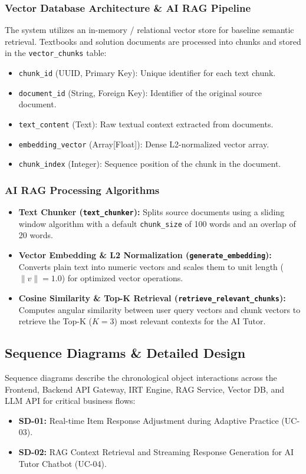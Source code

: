 \documentclass[12pt,a4paper]{article}
\begin{document}
\subsubsection{Vector Database Architecture \& AI RAG Pipeline}
The system utilizes an in-memory / relational vector store for baseline semantic retrieval. Textbooks and solution documents are processed into chunks and stored in the \texttt{vector\_chunks} table:
\begin{itemize}[leftmargin=1.5em, itemsep=0.2em]
    \item \texttt{chunk\_id} (UUID, Primary Key): Unique identifier for each text chunk.
    \item \texttt{document\_id} (String, Foreign Key): Identifier of the original source document.
    \item \texttt{text\_content} (Text): Raw textual context extracted from documents.
    \item \texttt{embedding\_vector} (Array[Float]): Dense L2-normalized vector array.
    \item \texttt{chunk\_index} (Integer): Sequence position of the chunk in the document.
\end{itemize}

\subsubsection{AI RAG Processing Algorithms}
\begin{itemize}[leftmargin=1.5em, itemsep=0.2em]
    \item \textbf{Text Chunker (\texttt{text\_chunker}):} Splits source documents using a sliding window algorithm with a default \texttt{chunk\_size} of 100 words and an overlap of 20 words.
    \item \textbf{Vector Embedding \& L2 Normalization (\texttt{generate\_embedding}):} Converts plain text into numeric vectors and scales them to unit length ($\|v\|=1.0$) for optimized vector operations.
    \item \textbf{Cosine Similarity \& Top-K Retrieval (\texttt{retrieve\_relevant\_chunks}):} Computes angular similarity between user query vectors and chunk vectors to retrieve the Top-K ($K=3$) most relevant contexts for the AI Tutor.
\end{itemize}

\subsection{Sequence Diagrams \& Detailed Design}
Sequence diagrams describe the chronological object interactions across the Frontend, Backend API Gateway, IRT Engine, RAG Service, Vector DB, and LLM API for critical business flows:
\begin{itemize}[leftmargin=1.5em, itemsep=0.2em]
    \item \textbf{SD-01:} Real-time Item Response Adjustment during Adaptive Practice (UC-03).
    \item \textbf{SD-02:} RAG Context Retrieval and Streaming Response Generation for AI Tutor Chatbot (UC-04).
\end{itemize}
\end{document}
